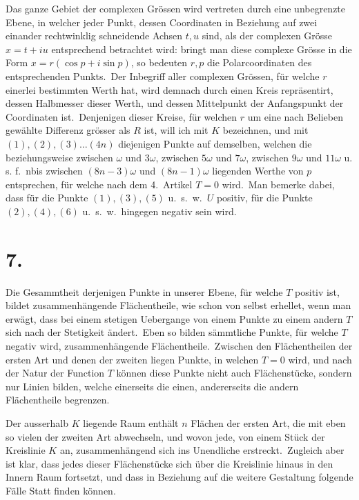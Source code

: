 \documentclass[12pt,a4paper]{article}
\theoremstyle{plain}
\begin{document}
Das ganze Gebiet der complexen Grössen wird vertreten durch eine unbegrenzte Ebene, in welcher jeder Punkt, dessen Coordinaten in Beziehung auf
zwei einander rechtwinklig schneidende Achsen $t, u$ sind, als der complexen
Grösse $x = t + iu$ entsprechend betrachtet wird: bringt man diese complexe
Grösse in die Form $x = r(\cos p + i \sin p)$, so bedeuten $r, p$ die Polarcoordinaten
des entsprechenden Punkts.\ Der Inbegriff aller complexen Grössen, für welche
$r$ einerlei bestimmten Werth hat, wird demnach durch einen Kreis repräsentirt,
dessen Halbmesser dieser Werth, und dessen Mittelpunkt der Anfangspunkt der
Coordinaten ist.\ Denjenigen dieser Kreise, für welchen $r$ um eine nach Belieben gewählte Differenz grösser als $R$ ist, will ich mit $K$ bezeichnen, und mit
$(1), (2), (3) \ldots (4n)$ diejenigen Punkte auf demselben, welchen die beziehungsweise zwischen $\omega$ und $3\omega$, zwischen $5\omega$ und $7\omega$, zwischen $9\omega$ und $11\omega$ u. s. f.\ nbis zwischen $(8n-3)\omega$ und $(8n-1)\omega$ liegenden Werthe von $p$ entsprechen,
für welche nach dem 4.\ Artikel $T = 0$ wird.\ Man bemerke dabei, dass für die
Punkte $(1), (3), (5)$ u.\ s.\ w.\ $U$ positiv, für die Punkte $(2), (4), (6)$ u.\ s.\ w.\ hingegen negativ sein wird.

\section*{7.}

Die Gesammtheit derjenigen Punkte in unserer Ebene, für welche $T$ positiv ist, bildet zusammenhängende Flächentheile, wie schon von selbst erhellet,
wenn man erwägt, dass bei einem stetigen Uebergange von einem Punkte zu einem andern $T$ sich nach der Stetigkeit ändert.\ Eben so bilden sämmtliche
Punkte, für welche $T$ negativ wird, zusammenhängende Flächentheile.\ Zwischen den Flächentheilen der ersten Art und denen der zweiten liegen Punkte, in
welchen $T = 0$ wird, und nach der Natur der Function $T$ können diese Punkte
nicht auch Flächenstücke, sondern nur Linien bilden, welche einerseits die einen, andererseits die andern Flächentheile begrenzen.

Der ausserhalb $K$ liegende Raum enthält $n$ Flächen der ersten Art, die mit
eben so vielen der zweiten Art abwechseln, und wovon jede, von einem Stück der
Kreislinie $K$ an, zusammenhängend sich ins Unendliche erstreckt.\ Zugleich aber
ist klar, dass jedes dieser Flächenstücke sich über die Kreislinie hinaus in den
Innern Raum fortsetzt, und dass in Beziehung auf die weitere Gestaltung folgende
Fälle Statt finden können.
\end{document}
